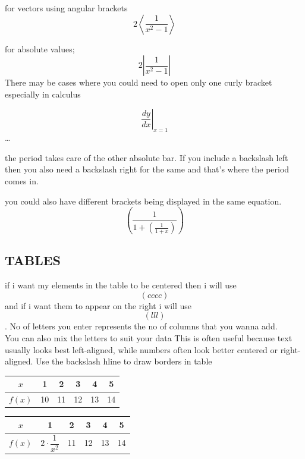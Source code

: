 \documentclass{article}
\begin{document}
  		for vectors using angular brackets
  		$$2\left \langle \frac{1}{x^2-1}\right \rangle$$
  		
  		for absolute values;
  		$$2\left |\frac{1}{x^2-1}\right| $$
  		There may be cases where you could need to open only one curly bracket especially in calculus
  		
  		$$\left.\frac{dy}{dx}\right |_{x=1}$$ \ldots
  		
  		 the period takes care of the other absolute bar. If you include a backslash left then you also need a backslash right for the same and that's where the period comes in.
  		
  		 you could also have different brackets being displayed in the same equation.
  		 $$\left(\frac{1}{1+\left(\frac{1}{1+x}\right)}\right)$$
  		 
  		 
  		 
  		 
  		 
  		 
  		 \subsection{TABLES}
  		 if i want my elements in the table to be centered then i will use $$\left(cccc\right)$$ and if i want them to appear on the right i will use $$\left(lll\right)$$. No of letters you enter represents the no of columns that you wanna add.\\
  		 
  		 You can also mix the letters to suit your data
  		 This is often useful because text usually looks best left-aligned, while numbers often look better centered or right-aligned.
  		 Use the backslash hline to draw borders in table\\[2pt]
  		 
  		\begin{table}[ht]
  			\centering
  	\def\arraystretch{1.5}
  		 \begin{tabular}{|c||c|c|c|c|c|}
  		 \hline
  		 \(x\) & 1 	& 2 & 3 & 4 & 5\\ \hline
  		 $f(x)$ & 10 & 11 & 12 & 13 & 14\\ \hline
  		 \end{tabular}
  		 
  		 \vspace{30pt}
  		 
  		{\renewcommand{\arraystretch}{1.8}
  		  \begin{tabular}{|c||c|c|c|c|c|}
  		 	\hline
  		 	$x$ & 1 & 2 & 3 & 4 & 5\\ \hline
  		 	$f(x)$ & $2\cdot \dfrac{1}{x^2} $ & 11 & 12 & 13 & 14\\ \hline
  		 \end{tabular}}
  		 \end{table}
  		 
\end{document}
